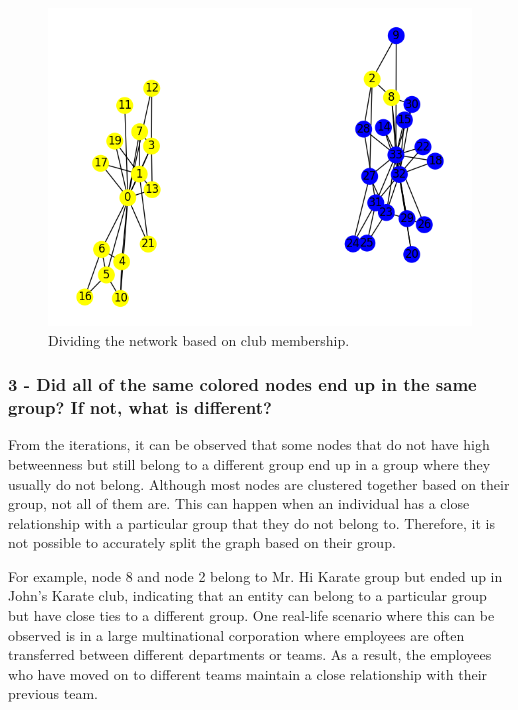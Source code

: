\documentclass[12pt]{article}
\begin{document}
\begin{figure}[h]
\caption{Dividing the network based on club membership.}
\centering
\includegraphics[width=\textwidth]{Figure_12.png}
\end{figure}

\clearpage

\subsubsection*{ 3 - Did all of the same colored nodes end up in the same group? If not, what is different? }

From the iterations, it can be observed that some nodes that do not have high betweenness but still belong to a different group end up in a group where they usually do not belong. Although most nodes are clustered together based on their group, not all of them are. This can happen when an individual has a close relationship with a particular group that they do not belong to. Therefore, it is not possible to accurately split the graph based on their group.

For example, node 8 and node 2 belong to Mr. Hi Karate group but ended up in John's Karate club, indicating that an entity can belong to a particular group but have close ties to a different group. One real-life scenario where this can be observed is in a large multinational corporation where employees are often transferred between different departments or teams. As a result, the employees who have moved on to different teams maintain a close relationship with their previous team.


\clearpage
\end{document}
